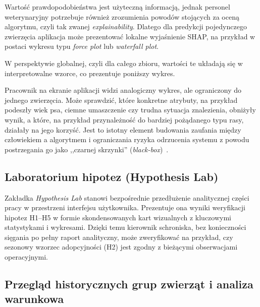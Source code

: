 Wartość prawdopodobieństwa jest użyteczną informacją, jednak personel weterynaryjny potrzebuje również zrozumienia powodów stojących za oceną algorytmu, czyli tak zwanej \emph{explainability}. Dlatego dla predykcji pojedynczego zwierzęcia aplikacja może prezentować lokalne wyjaśnienie SHAP, na przykład w postaci wykresu typu \emph{force plot} lub \emph{waterfall plot}.

W perspektywie globalnej, czyli dla całego zbioru, wartości te układają się w interpretowalne wzorce, co prezentuje poniższy wykres.


Pracownik na ekranie aplikacji widzi analogiczny wykres, ale ograniczony do jednego zwierzęcia. Może sprawdzić, które konkretne atrybuty, na przykład podeszły wiek psa, ciemne umaszczenie czy trudna sytuacja znalezienia, obniżyły wynik, a które, na przykład przynależność do bardziej pożądanego typu rasy, działały na jego korzyść. Jest to istotny element budowania zaufania między człowiekiem a algorytmem i ograniczania ryzyka odrzucenia systemu z powodu postrzegania go jako ,,czarnej skrzynki'' (\emph{black-box})~\cite{Adadi2018}.

\subsection{Laboratorium hipotez (Hypothesis Lab)}
\label{subsec:laboratorium-hipotez}

Zakładka \emph{Hypothesis Lab} stanowi bezpośrednie przedłużenie analitycznej części pracy w przestrzeni interfejsu użytkownika. Prezentuje ona wyniki weryfikacji hipotez H1--H5 w formie skondensowanych kart wizualnych z kluczowymi statystykami i wykresami. Dzięki temu kierownik schroniska, bez konieczności sięgania po pełny raport analityczny, może zweryfikować na przykład, czy sezonowy wzorzec adopcyjności (H2) jest zgodny z bieżącymi obserwacjami operacyjnymi.


\subsection{Przegląd historycznych grup zwierząt i analiza warunkowa}
\label{subsec:przeglad-historycznych-grup-zwierzat}

